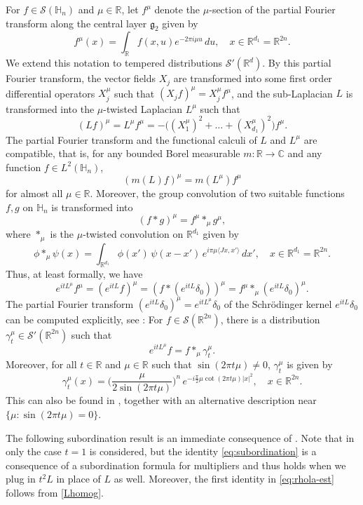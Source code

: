 \documentclass[leqno]{amsart}
\theoremstyle{definition}
\theoremstyle{remark}
\numberwithin{equation}{section}
\newcommand{\R}{\mathbb{R}}
\newcommand{\C}{\mathbb{C}}
\newcommand{\g}{\mathfrak{g}}
\begin{document}
For $f\in \mathcal S(\mathbb H_n)$ and $\mu\in\R$, let $f^\mu$ denote the $\mu$-section of the partial Fourier transform along the central layer $\g_2$ given by
\[
f^\mu(x) = \int_{\R} f(x,u) e^{- 2\pi i \mu u} \, du,\quad x\in \R^{d_1}=\R^{2n}.
\]
We extend this notation to tempered distributions $\mathcal S'(\R^d)$. By this partial Fourier transform, the vector fields $X_j$ are transformed into some first order differential operators $X_j^\mu$ such that $(X_jf)^\mu = X_j^\mu f^\mu$, and the sub-Laplacian $L$ is transformed into the $\mu$-twisted Laplacian $L^\mu$ such that
\[
(Lf)^\mu = L^\mu f^\mu = -\big((X_1^\mu)^2 + \dots + (X_{d_1}^\mu)^2\big) f^\mu.
\]
The partial Fourier transform and the functional calculi of $L$ and $L^\mu$ are compatible, that is, for any bounded Borel measurable $m:\R\to\C$ and any function $f\in L^2(\mathbb H_n)$,
\[
(m(L) f)^\mu = m(L^\mu) f^\mu
\]
for almost all $\mu\in \R$. Moreover, the group convolution of two suitable functions $f,g$ on $\mathbb H_n$ is transformed into
\[
(f*g)^\mu = f^\mu *_\mu g^\mu,
\]
where $*_\mu$ is the $\mu$-twisted convolution on $\R^{d_1}$ given by
\[
\phi *_\mu \psi (x) = \int_{\R^{d_1}} \phi(x') \, \psi(x-x') \, e^{i \pi \mu\langle J x,x' \rangle} \, dx',
\quad x\in \R^{d_1}=\R^{2n}.
\]
Thus, at least formally, we have
\[
e^{itL^\mu}f^\mu=(e^{itL} f )^\mu=(f*(e^{itL}\delta_0))^\mu= f^\mu *_\mu (e^{itL}\delta_0)^\mu.
\]
The partial Fourier transform $(e^{itL}\delta_0)^\mu= e^{itL^\mu}\delta_0$ of the Schrödinger kernel $e^{itL }\delta_0$ can be computed explicitly, see \cite{MuellerRicci-Inv90}: 
For $f\in \mathcal S(\R^{2n})$, there is a distribution $\gamma_t^\mu \in \mathcal S'(\R^{2n})$ such that
\begin{equation}\label{eq:gamma}
e^{itL^\mu } f = f *_\mu \gamma_t^\mu.
\end{equation}
Moreover, for all $t\in \R$ and $\mu\in \R$ such that $\sin (2\pi t \mu)\neq 0$, $\gamma_t^\mu$ is given by
\begin{equation}
\label{eq:gammatmu}
\gamma_t^\mu (x) = \Big(\frac {\mu}{2\sin (2\pi t \mu )}\Big)^{ n} \, 
e^{-i\frac {\pi}2 \mu \cot(2\pi t \mu)|x|^2},\quad x\in \R^{2n}.
\end{equation}
This can also  be found in \cite[Proposition~3.2]{MuellerSeeger2015}, together with an alternative description near $\{\mu:\sin(2\pi t\mu)=0\} $.

\smallskip

The following subordination result is an immediate consequence of \cite[Proposition~3.2]{MuellerSeeger2015}. Note that in  \cite{MuellerSeeger2015} only the case $t=1$ is considered, but the  identity \eqref{eq:subordination} is a consequence of  a subordination formula for  multipliers and thus holds when we plug in $t^2L$ in place of $L$ as well. Moreover, the first identity in \eqref{eq:rhola-est} follows from \eqref{Lhomog}.
\end{document}
